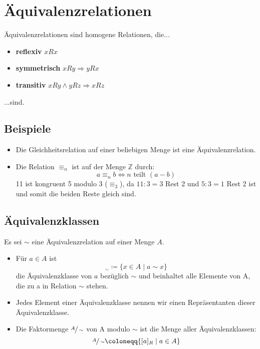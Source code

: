 \section{Äquivalenzrelationen}
Äquivalenzrelationen sind homogene Relationen, die...
\begin{itemize}
    \item \textbf{reflexiv} $xRx$
    \item \textbf{symmetrisch} $xRy \Rightarrow yRx$
    \item \textbf{transitiv} $xRy \wedge yRz \Rightarrow xRz$
\end{itemize}
...sind.
\subsection{Beispiele}
\begin{itemize}
    \item Die Gleichheitsrelation auf einer beliebigen Menge ist eine
    Äquivalenzrelation.
    \item Die Relation $\equiv_n$ ist auf der Menge $\mathbb{Z}$ durch:
    \begin{equation}
        a \equiv_n b \Leftrightarrow n \text{ teilt } (a - b)  
    \end{equation}
    11 ist kongruent 5 modulo 3 ($\equiv_3$), da $11 : 3 = 3$  Rest  2 
    und $5 : 3 = 1$  Rest  2 ist und somit die beiden Reste gleich sind.
\end{itemize}
\subsection{Äquivalenzklassen}
Es sei $\sim$ eine Äquivalenzrelation auf einer Menge $A$. 
\begin{itemize}
    \item Für $a \in A$ ist
    \begin{equation}
        [a]_{\sim} \coloneqq \{x \in A \mid a \sim x\}
    \end{equation}
    die Äquivalenzklasse von $a$ bezüglich $\sim$ und beinhaltet alle Elemente von A, die zu a in Relation
    $\sim$ stehen.
    \item Jedes Element einer Äquivalenzklasse nennen wir einen
    Repräsentanten dieser Äquivalenzklasse.
    \item Die Faktormenge $\sfrac{A}{\sim}$ von A modulo $\sim$ ist die Menge aller Äquivalenzklassen:
    \begin{equation}
        \sfrac{A}{\sim} \coloneqq \{[a]_{R} \mid a \in A\}
    \end{equation}
\end{itemize}
